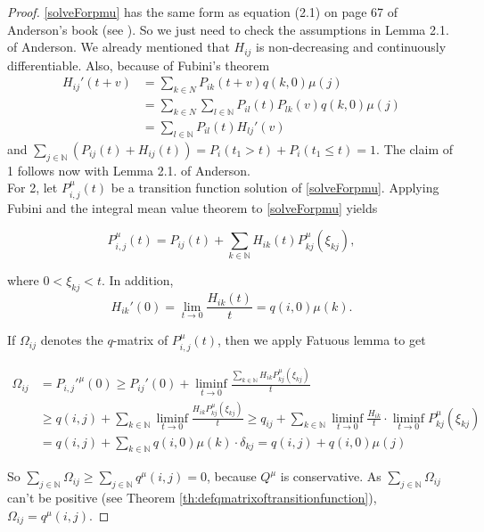\documentclass[12pt,a4paper]{scrartcl}
\numberwithin{equation}{section}
\newcommand{\N}{\mathbb{N}} %
\begin{document}
\begin{proof}
\eqref{solveForpmu} has the same form as equation (2.1) on page 67 of Anderson's book (see \cite{anderson}). So we just need to check the assumptions in Lemma 2.1. of Anderson. We already mentioned that $H_{ij}$ is non-decreasing and continuously differentiable. 
Also, because of Fubini's theorem 
\begin{align*} H_{ij}'\left(t+v\right) 
&= \sum_{k \in N} P_{ik}\left(t+v\right) q\left(k,0\right) \mu\left(j\right) \\
&= \sum_{k \in N} \sum_{l \in \N} P_{il}\left(t\right) P_{lk}\left(v\right) q\left(k,0\right) \mu\left(j\right) \\
&= \sum_{l \in \N} P_{il}\left(t\right) H_{lj}' \left(v\right) 
\end{align*}
and $ \sum_{j \in \N} \left(P_{ij}\left(t\right) + H_{ij}\left(t\right) \right) = P_i\left(t_1 > t\right) + P_i\left(t_1 \leq t\right) = 1. $
The claim of 1 follows now with Lemma 2.1. of Anderson. \\[2ex]

For 2, let $P_{i,j}^{\mu}\left(t\right) $ be a transition function solution of \eqref{solveForpmu}. Applying Fubini and the integral mean value theorem to \eqref{solveForpmu} yields

$$ P_{i,j}^{\mu}\left(t\right) = P_{ij}\left(t\right) + \sum_{k \in \N} H_{ik}\left(t\right) P_{kj}^{\mu}\left(\xi_{kj}\right), $$

where $ 0 < \xi_{kj} < t $.
In addition,
$$ H_{ik}' \left(0\right) = \lim_{t \to 0} \frac{H_{ik}\left(t\right)}{t} = q\left(i,0\right) \mu\left(k\right). $$

If $ \Omega_{ij} $ denotes the $q$-matrix of $ P_{i,j}^{\mu}\left(t\right) $, then we apply Fatuous lemma to get

\begin{align*}
\Omega_{ij} &= P_{i,j}'^{\mu}\left(0\right) \geq P_{ij}'\left(0\right) + \liminf_{t \to 0} \frac{\sum_{k \in \N}H_{ik} P_{kj}^{\mu}\left(\xi_{kj}\right) }{t} \\
&\geq q\left(i,j\right)+  \sum_{k \in \N} \liminf_{t \to 0} \frac{H_{ik} P_{kj}^{\mu}\left(\xi_{kj}\right) }{t} \geq q_{ij}+  \sum_{k \in \N} \liminf_{t \to 0} \frac{H_{ik}}{t} \cdot \liminf_{t \to 0} P_{kj}^{\mu}\left(\xi_{kj}\right)\\
&= q\left(i,j\right)+  \sum_{k \in \N} q\left(i,0\right) \mu\left(k\right) \cdot \delta_{kj} = q\left(i,j\right) + q\left(i,0\right) \mu\left(j\right)
\end{align*}

So $ \sum_{j \in \N} \Omega_{ij} \geq \sum_{j \in \N} q^{\mu}\left(i,j\right) = 0 $, because 
$Q^{\mu}$ is conservative. As $\sum_{j \in \N} \Omega_{ij}$ can't be positive (see Theorem \ref{th:defqmatrixoftransitionfunction}), $ \Omega_{ij} = q^{\mu}\left(i,j\right)$.
\end{proof}
\end{document}
